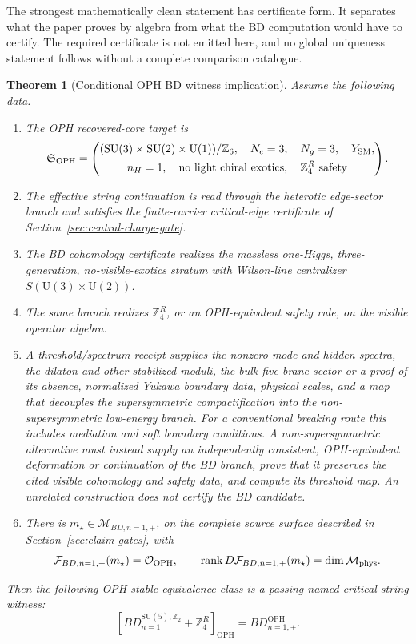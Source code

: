 \documentclass[11pt]{article}
\newtheorem{theorem}{Theorem}[section]
\theoremstyle{remark}
\theoremstyle{plain}
\newcommand{\OPH}{\mathrm{OPH}}
\newcommand{\SU}{\mathrm{SU}}
\newcommand{\U}{\mathrm{U}}
\newcommand{\Z}{\mathbb Z}
\newcommand{\calF}{\mathcal F}
\newcommand{\calO}{\mathcal O}
\newcommand{\ZfourR}{\mathbb Z_4^R}
\begin{document}
The strongest mathematically clean statement has certificate form. It separates what the paper
proves by algebra from what the BD computation would have to certify. The required certificate is
not emitted here, and no global uniqueness statement follows without a complete comparison
catalogue.

\begin{theorem}[Conditional OPH BD witness implication]
Assume the following data.
\begin{enumerate}[leftmargin=2em]
\item The OPH recovered-core target is
\[
\mathfrak S_{\OPH}=
\left(
\begin{gathered}
(\SU(3)\times\SU(2)\times\U(1))/\Z_6,\quad N_c=3,\quad N_g=3,\quad Y_{\rm SM},\\
n_H=1,\quad \text{no light chiral exotics},\quad \ZfourR\text{ safety}
\end{gathered}
\right).
\]
\item The effective string continuation is read through the heterotic edge-sector branch and
satisfies the finite-carrier critical-edge certificate of Section~\ref{sec:central-charge-gate}.
\item The BD cohomology certificate realizes the massless one-Higgs, three-generation,
no-visible-exotics stratum with Wilson-line centralizer \(S(\U(3)\times\U(2))\).
\item The same branch realizes \(\ZfourR\), or an OPH-equivalent safety rule, on the visible
operator algebra.
\item A threshold/spectrum receipt supplies the nonzero-mode and hidden spectra, the dilaton and
other stabilized moduli, the bulk five-brane sector or a proof of its absence, normalized Yukawa
boundary data, physical scales, and a map that decouples the supersymmetric compactification into the non-supersymmetric
low-energy branch. For a conventional breaking route this includes mediation and soft boundary
conditions. A non-supersymmetric alternative must instead supply an independently consistent,
OPH-equivalent deformation or continuation of the BD branch, prove that it preserves the cited
visible cohomology and safety data, and compute its threshold map. An unrelated construction does
not certify the BD candidate.
\item There is \(m_\star\in\mathcal M_{BD,n=1,+}\), on the complete source surface described in
Section~\ref{sec:claim-gates}, with
\[
\calF_{BD,n=1,+}(m_\star)=\calO_{\OPH},
\qquad
\operatorname{rank}D\calF_{BD,n=1,+}(m_\star)=\dim\mathcal M_{\rm phys}.
\]
\end{enumerate}
Then the following OPH-stable equivalence class is a passing named critical-string witness:
\[
\boxed{
\left[
BD_{n=1}^{\SU(5),\Z_2}+\ZfourR
\right]_{\OPH}
=
BD_{n=1,+}^{\OPH}.
}
\]
\end{theorem}
\end{document}

